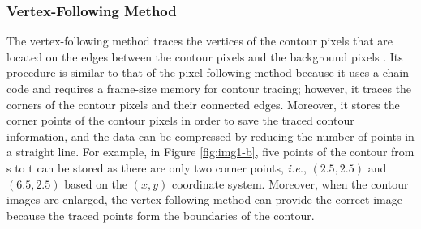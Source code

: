 \documentclass[sensors,article,accept,moreauthors,pdftex,10pt,a4paper]{mdpi}
\begin{document}




\subsubsection{Vertex-Following Method}

The vertex-following method traces the vertices of the contour pixels that are located on the edges between the contour pixels and the background pixels \cite{Miyatake1997Contour}. Its procedure is similar to that of the pixel-following method because it uses a chain code and requires a frame-size memory for contour tracing; however, it traces the corners of the contour pixels and their connected edges. Moreover, it stores the corner points of the contour pixels in order to save the traced contour information, and the data can be compressed by reducing the number of points in a straight line. For example, in Figure \ref{fig:img1-b}, five points of the contour from s to t can be stored as there are only two corner points, \emph{i.e.}, $(2.5, 2.5)$ and $(6.5, 2.5)$ based on the $(x, y)$ coordinate system. Moreover, when the contour images are enlarged, the vertex-following method can provide the correct image \cite{Miyatake1997Contour} because the traced points form the boundaries of the contour.
\end{document}
